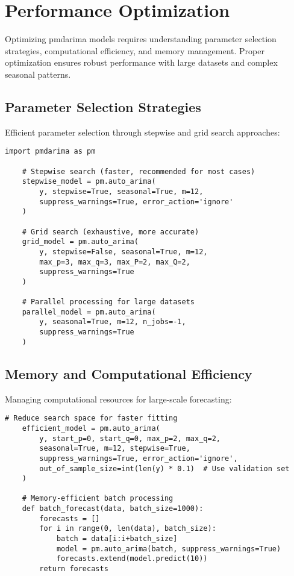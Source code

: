 \section{Performance Optimization}
\label{sec:optimization}

Optimizing pmdarima models requires understanding parameter selection strategies, computational efficiency, and memory management. Proper optimization ensures robust performance with large datasets and complex seasonal patterns.

\subsection{Parameter Selection Strategies}
\label{subsec:parameter_strategies}

Efficient parameter selection through stepwise and grid search approaches:

\begin{lstlisting}[language=MyPython, caption={Optimization Strategies}, label={lst:optimization}]
	import pmdarima as pm
	
	# Stepwise search (faster, recommended for most cases)
	stepwise_model = pm.auto_arima(
	    y, stepwise=True, seasonal=True, m=12,
	    suppress_warnings=True, error_action='ignore'
	)
	
	# Grid search (exhaustive, more accurate)
	grid_model = pm.auto_arima(
	    y, stepwise=False, seasonal=True, m=12,
	    max_p=3, max_q=3, max_P=2, max_Q=2,
	    suppress_warnings=True
	)
	
	# Parallel processing for large datasets
	parallel_model = pm.auto_arima(
	    y, seasonal=True, m=12, n_jobs=-1,
	    suppress_warnings=True
	)
\end{lstlisting}

\subsection{Memory and Computational Efficiency}
\label{subsec:efficiency}

Managing computational resources for large-scale forecasting:

\begin{lstlisting}[language=MyPython, caption={Efficiency Optimization}, label={lst:efficiency}]
	# Reduce search space for faster fitting
	efficient_model = pm.auto_arima(
	    y, start_p=0, start_q=0, max_p=2, max_q=2,
	    seasonal=True, m=12, stepwise=True,
	    suppress_warnings=True, error_action='ignore',
	    out_of_sample_size=int(len(y) * 0.1)  # Use validation set
	)
	
	# Memory-efficient batch processing
	def batch_forecast(data, batch_size=1000):
	    forecasts = []
	    for i in range(0, len(data), batch_size):
	        batch = data[i:i+batch_size]
	        model = pm.auto_arima(batch, suppress_warnings=True)
	        forecasts.extend(model.predict(10))
	    return forecasts
\end{lstlisting}

